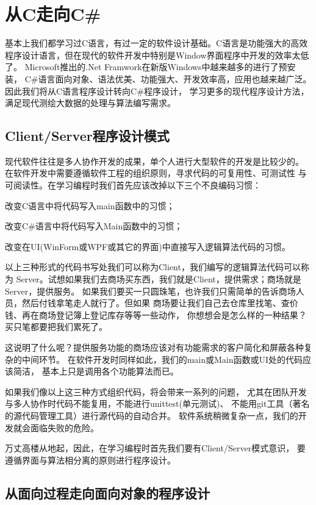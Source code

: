﻿%

\chapter{从C走向C\#}

基本上我们都学习过C语言，有过一定的软件设计基础。C语言是功能强大的高效
程序设计语言，但在现代的软件开发中特别是Window界面程序中开发的效率太低了。
Microsoft推出的.Net Framwork在新版Windows中越来越多的进行了预安装，
C\#语言面向对象、语法优美、功能强大、开发效率高，应用也越来越广泛。
因此我们将从C语言程序设计转向C\#程序设计，
学习更多的现代程序设计方法，满足现代测绘大数据的处理与算法编写需求。

\section{Client/Server程序设计模式}
现代软件往往是多人协作开发的成果，单个人进行大型软件的开发是比较少的。
在软件开发中需要遵循软件工程的组织原则，寻求代码的可复用性、可测试性
与可阅读性。在学习编程时我们首先应该改掉以下三个不良编码习惯：

改变C语言中将代码写入main函数中的习惯；

改变C\#语言中将代码写入Main函数中的习惯；

改变在UI(WinForm或WPF或其它的界面)中直接写入逻辑算法代码的习惯。

以上三种形式的代码书写处我们可以称为Client，我们编写的逻辑算法代码可以称为
Server。试想如果我们去商场买东西，我们就是Client，提供需求；商场就是Server，提供服务。
如果我们要买一只圆珠笔，也许我们只需简单的告诉商场人员，然后付钱拿笔走人就行了。但如果
商场要让我们自己去仓库里找笔、查价钱、再在商场登记簿上登记库存等等一些动作，
你想想会是怎么样的一种结果？买只笔都要把我们累死了。

这说明了什么呢？提供服务功能的商场应该对有功能需求的客户简化和屏蔽各种复杂的中间环节。
在软件开发时同样如此，我们的main或Main函数或UI处的代码应该简洁，
基本上只是调用各个功能算法而已。

如果我们像以上这三种方式组织代码，将会带来一系列的问题，
尤其在团队开发与多人协作时代码不能复用，不能进行unittest(单元测试)、
不能用git工具（著名的源代码管理工具）进行源代码的自动合并。
软件系统稍微复杂一点，我们的开发就会面临失败的危险。

万丈高楼从地起，因此，在学习编程时首先我们要有Client/Server模式意识，
要遵循界面与算法相分离的原则进行程序设计。

\section{从面向过程走向面向对象的程序设计 }

